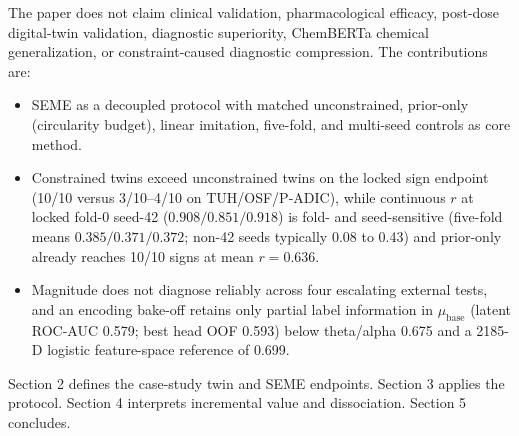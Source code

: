 The paper does not claim clinical validation, pharmacological efficacy, post-dose digital-twin validation, diagnostic superiority, ChemBERTa chemical generalization, or constraint-caused diagnostic compression. The contributions are:

\begin{itemize}
  \item SEME as a decoupled protocol with matched unconstrained, prior-only (circularity budget), linear imitation, five-fold, and multi-seed controls as core method.
  \item Constrained twins exceed unconstrained twins on the locked sign endpoint (10/10 versus 3/10--4/10 on TUH/OSF/P-ADIC), while continuous \(r\) at locked fold-0 seed-42 (\(0.908/0.851/0.918\)) is fold- and seed-sensitive (five-fold means \(0.385/0.371/0.372\); non-42 seeds typically 0.08 to 0.43) and prior-only already reaches 10/10 signs at mean \(r = 0.636\).
  \item Magnitude does not diagnose reliably across four escalating external tests, and an encoding bake-off retains only partial label information in \(\mu_{\mathrm{base}}\) (latent ROC-AUC 0.579; best head OOF 0.593) below theta/alpha 0.675 and a 2185-D logistic feature-space reference of 0.699.
\end{itemize}

Section 2 defines the case-study twin and SEME endpoints. Section 3 applies the protocol. Section 4 interprets incremental value and dissociation. Section 5 concludes.
